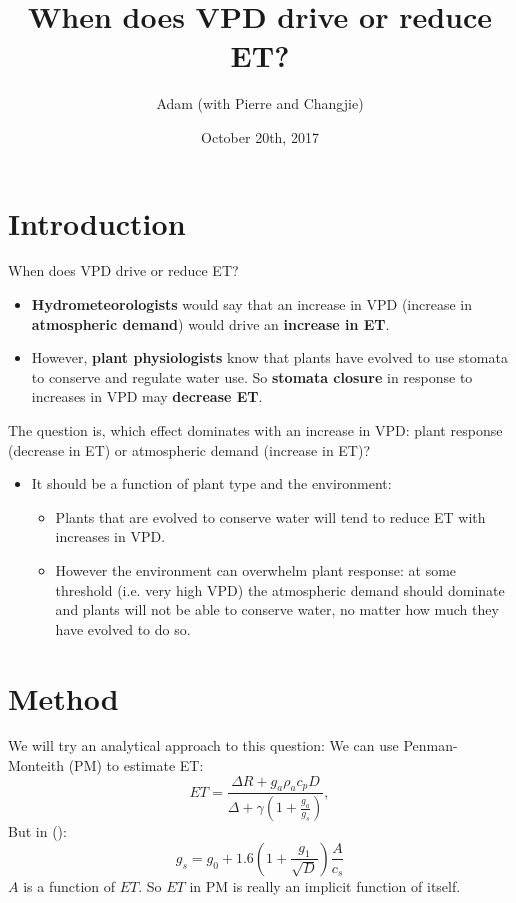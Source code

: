 \documentclass{beamer}
\title[Your Short Title]{When does VPD drive or reduce ET?}
\author{Adam (with Pierre and Changjie)}
\institute{G-Lab Meeting}
\date{October 20th, 2017}
\begin{document}
\begin{frame}
  \titlepage
\end{frame}

\section{Introduction}
\begin{frame}{When does VPD drive or reduce ET?}
  \begin{itemize}
  \item \textbf{Hydrometeorologists} would say that an increase in VPD (increase in \textbf{atmospheric demand}) would drive an \textbf{increase in ET}.
  \item However, \textbf{plant physiologists} know that plants have evolved to use stomata to conserve and regulate water use. So \textbf{stomata closure} in response to increases in VPD may \textbf{decrease ET}.
  \end{itemize}
\end{frame}

\begin{frame}{The question is, which effect dominates with an increase in VPD: plant response (decrease in ET) or atmospheric demand (increase in ET)?}
  \begin{itemize}
  \item It should be a function of plant type and the environment:
    \begin{itemize}
    \item Plants that are evolved to conserve water will tend to reduce ET with increases in VPD.
    \item However the environment can overwhelm plant response: at some threshold (i.e. very high VPD) the atmospheric demand should dominate and plants will not be able to conserve water, no matter how much they have evolved to do so.
    \end{itemize}
  \end{itemize}
\end{frame}

\section{Method}
\begin{frame}{We will try an analytical approach to this question:}
  We can use Penman-Monteith (PM) to estimate ET:
  \[ET = \frac{\Delta R + g_a \rho_a c_p D}{\Delta + \gamma(1 + \frac{g_a}{g_s})},\]
  But in (\cite{MEDLYN_2011}):
  \[  g_{s} = g_0 + 1.6 \left(1 + \frac{g_1}{\sqrt{D}}\right) \frac{A}{c_s}\]
  $A$ is a function of $ET$. So $ET$ in PM is really an implicit function of itself.
\end{frame}
\end{document}

